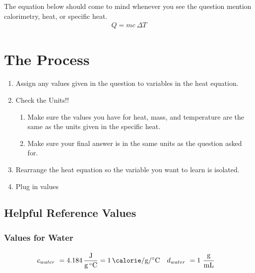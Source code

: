 \documentclass[12pt, oneside, letterpaper]{book}
\begin{document}
%
\pagestyle{fancy} %
\renewcommand{\headrulewidth}{0pt}
\fancyhead{}
\fancyhead[R]{\thepage}
\fancyfoot{} %
\renewcommand{\footrulewidth}{0.1pt}
%
%
%
The equation below should come to mind whenever you see the question mention calorimetry, heat, or specific heat. 
\begin{gather*}
    Q=mc\ \Delta T
\end{gather*}

\section{The Process}

\begin{enumerate}
   \item Assign any values given in the question to variables in the heat equation.
   \item Check the Units!!
   \begin{enumerate}
     \item Make sure the values you have for heat, mass, and temperature are the same as the units given in the specific heat. 
     \item Make sure your final answer is in the same units as the question asked for.
    \end{enumerate}
  \item Rearrange the heat equation so the variable you want to learn is isolated. 
  \item Plug in values 
\end{enumerate}

\subsection{Helpful Reference Values}

\subsubsection{Values for Water}
\begin{align*}
    &   c_{water}\ = \qty[per-mode=fraction]{4.184}{\joule\per\gram\per\degreeCelsius} = \qty[per-mode=fraction]{1}{\calorie \per\gram \per\degreeCelsius} & d_{water}\ = 1\ \cfrac{\si{\g}}{\si{\mL}} &
\end{align*}
\end{document}
